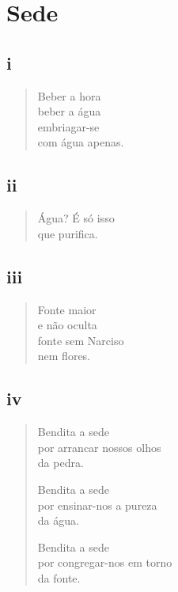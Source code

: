 \chapter{Sede}

\section{i}

\begin{verse}
Beber a hora\\
beber a água\\
embriagar-se\\
com água apenas.
\end{verse}

\medskip
\section{ii}

\begin{verse}
Água? É só isso\\
que purifica.
\end{verse}

\medskip
\section{iii}

\begin{verse}
Fonte maior\\
e não oculta\\
fonte sem Narciso\\
nem flores.
\end{verse}

\medskip
\section{iv}

\begin{verse}
Bendita a sede\\
por arrancar nossos olhos\\
da pedra.

Bendita a sede\\
por ensinar-nos a pureza\\
da água.

Bendita a sede\\
por congregar-nos em torno\\
da fonte.
\end{verse}

